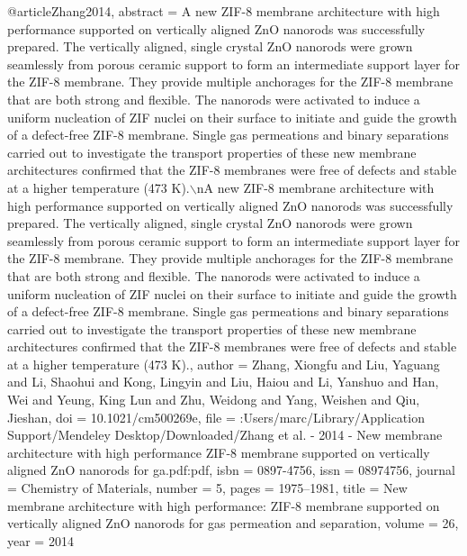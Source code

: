 @article{Zhang2014,
abstract = {A new ZIF-8 membrane architecture with high performance supported on vertically aligned ZnO nanorods was successfully prepared. The vertically aligned, single crystal ZnO nanorods were grown seamlessly from porous ceramic support to form an intermediate support layer for the ZIF-8 membrane. They provide multiple anchorages for the ZIF-8 membrane that are both strong and flexible. The nanorods were activated to induce a uniform nucleation of ZIF nuclei on their surface to initiate and guide the growth of a defect-free ZIF-8 membrane. Single gas permeations and binary separations carried out to investigate the transport properties of these new membrane architectures confirmed that the ZIF-8 membranes were free of defects and stable at a higher temperature (473 K).$\backslash$nA new ZIF-8 membrane architecture with high performance supported on vertically aligned ZnO nanorods was successfully prepared. The vertically aligned, single crystal ZnO nanorods were grown seamlessly from porous ceramic support to form an intermediate support layer for the ZIF-8 membrane. They provide multiple anchorages for the ZIF-8 membrane that are both strong and flexible. The nanorods were activated to induce a uniform nucleation of ZIF nuclei on their surface to initiate and guide the growth of a defect-free ZIF-8 membrane. Single gas permeations and binary separations carried out to investigate the transport properties of these new membrane architectures confirmed that the ZIF-8 membranes were free of defects and stable at a higher temperature (473 K).},
author = {Zhang, Xiongfu and Liu, Yaguang and Li, Shaohui and Kong, Lingyin and Liu, Haiou and Li, Yanshuo and Han, Wei and Yeung, King Lun and Zhu, Weidong and Yang, Weishen and Qiu, Jieshan},
doi = {10.1021/cm500269e},
file = {:Users/marc/Library/Application Support/Mendeley Desktop/Downloaded/Zhang et al. - 2014 - New membrane architecture with high performance ZIF-8 membrane supported on vertically aligned ZnO nanorods for ga.pdf:pdf},
isbn = {0897-4756},
issn = {08974756},
journal = {Chemistry of Materials},
number = {5},
pages = {1975--1981},
title = {{New membrane architecture with high performance: ZIF-8 membrane supported on vertically aligned ZnO nanorods for gas permeation and separation}},
volume = {26},
year = {2014}
}
